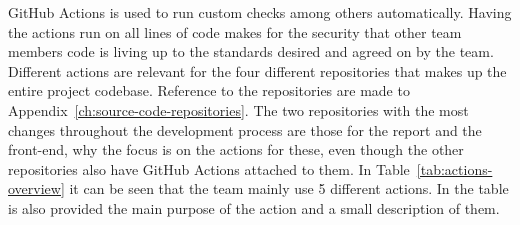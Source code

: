 GitHub Actions is used to run custom checks among others automatically.
Having the actions run on all lines of code makes for the security that other team members code is living up to the
standards desired and agreed on by the team.
Different actions are relevant for the four different repositories that makes up the entire project codebase.
Reference to the repositories are made to Appendix~\ref{ch:source-code-repositories}.
The two repositories with the most changes throughout the development process are those for the report and the
front-end, why the focus is on the actions for these, even though the other repositories also have GitHub Actions
attached to them.
In Table~\ref{tab:actions-overview} it can be seen that the team mainly use 5 different actions.
In the table is also provided the main purpose of the action and a small description of them.

